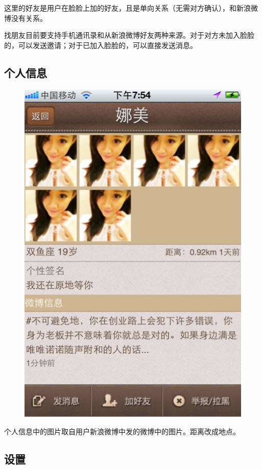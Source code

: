 \documentclass[cs4size]{ctexartutf8}
\begin{document}
这里的好友是用户在脸脸上加的好友，且是单向关系（无需对方确认），和新浪微博没有关系。

找朋友目前要支持手机通讯录和从新浪微博好友两种来源。对于对方未加入脸脸的，可以发送邀请；对于已加入脸脸的，可以直接发送消息。

\subsection{个人信息}

\begin{figure}[H]
\centering
\includegraphics[scale=0.5]{./9.png}
\end{figure}

个人信息中的图片取自用户新浪微博中发的微博中的图片。距离改成地点。

\subsection{设置}
\end{document}
